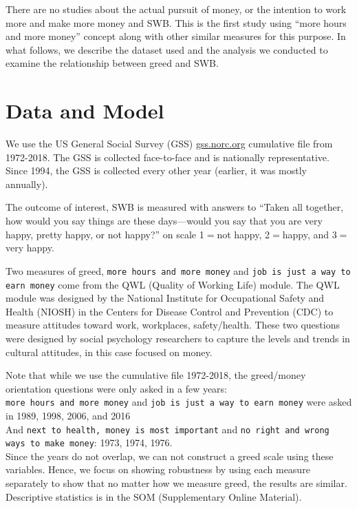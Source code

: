 \documentclass[10pt, letterpaper]{article}
\begin{document}
\begin{spacing}{1.8}
There are no studies about the actual pursuit of money, or the intention to work
more and make more money and SWB. This is the first study using ``more hours and
more money'' concept along with other similar measures for this purpose. In what follows, we describe the dataset used and the analysis we conducted to examine the relationship between greed and SWB. 


\section{Data and Model}

We use the US General Social Survey (GSS) \url{gss.norc.org} cumulative file from
1972-2018. The GSS is collected face-to-face and is nationally
representative. Since 1994, the GSS is collected every other year (earlier, it was mostly annually).

The outcome of interest, SWB is measured with answers to ``Taken all together, how would you say things are these days---would you say that you are very happy,
pretty happy, or not happy?'' on scale  1$=$not happy, 2$=$happy, and 3$=$very happy. 

Two measures of greed, \texttt{more hours and more money} and  \texttt{job is just a way to earn money} come from the QWL (Quality of Working Life) module. The QWL module was designed by the National Institute for Occupational Safety and Health (NIOSH) in the Centers for Disease Control and Prevention (CDC) to measure attitudes toward work, workplaces,
safety/health. These two questions  were designed by social psychology researchers to capture the levels and trends in cultural attitudes, in this case focused on money. 

Note that while we use the cumulative file  1972-2018, the greed/money orientation questions were only asked in a few years:\\
\texttt{more hours and more money} and \texttt{job is just a way to earn money} were asked in 1989, 1998, 2006, and 2016\\
And \texttt{next to  health, money is most  important} and \texttt{no right and wrong  ways to  make money}: 1973, 1974, 1976.\\

Since the years do not overlap, we can not construct a greed scale using these variables. Hence, we focus on
showing robustness by using each measure separately to show that no matter how we measure greed, the results are similar. 
%
 Descriptive statistics is in the SOM (Supplementary Online Material).


\end{spacing}
\end{document}
